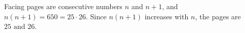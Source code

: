Facing pages are consecutive numbers $n$ and $n+1$, and $n(n+1)=650=25\cdot26$. Since $n(n+1)$ increases with $n$, the pages are $\boxed{25\text{ and }26}$.
